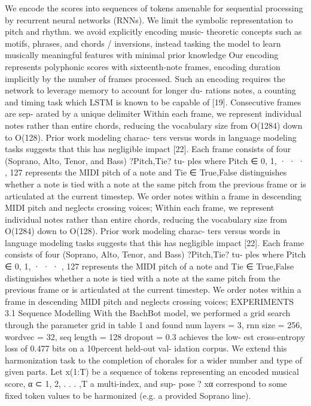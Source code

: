We encode the scores into sequences of tokens amenable for sequential processing by recurrent neural networks (RNNs). We limit the symbolic representation to pitch and rhythm. we avoid explicitly encoding music- theoretic concepts such as motifs, phrases, and chords / inversions, instead tasking the model to learn musically meaningful features with minimal prior knowledge
Our encoding represents polyphonic scores with sixteenth-note frames, encoding duration implicitly by the number of frames processed. Such an encoding requires the network to leverage memory to account for longer du- rations notes, a counting and timing task which LSTM is known to be capable of [19]. Consecutive frames are sep- arated by a unique delimiter
Within each frame, we represent individual notes rather than entire chords, reducing the vocabulary size from O(1284) down to O(128). Prior work modeling charac- ters versus words in language modeling tasks suggests that this has negligible impact [22]. Each frame consists of
four (Soprano, Alto, Tenor, and Bass) ?Pitch,Tie? tu- ples where Pitch ∈ {0, 1, · · · , 127} represents the MIDI pitch of a note and Tie ∈ {True,False} distinguishes whether a note is tied with a note at the same pitch from the previous frame or is articulated at the current timestep. We order notes within a frame in descending MIDI pitch and neglects crossing voices;
Within each frame, we represent individual notes rather
than entire chords, reducing the vocabulary size from O(1284) down to O(128). Prior work modeling charac- ters versus words in language modeling tasks suggests that this has negligible impact [22]. Each frame consists of
four (Soprano, Alto, Tenor, and Bass) ?Pitch,Tie? tu- ples where Pitch ∈ {0, 1, · · · , 127} represents the MIDI pitch of a note and Tie ∈ {True,False} distinguishes whether a note is tied with a note at the same pitch from the
previous frame or is articulated at the current timestep. We order notes within a frame in descending MIDI pitch and neglects crossing voices;
EXPERIMENTS 3.1 Sequence Modelling
With the BachBot model, we performed a grid search through the parameter grid in table 1 and found num layers = 3, rnn size = 256, wordvec = 32, seq length = 128 dropout = 0.3 achieves the low- est cross-entropy loss of 0.477 bits on a 10percent held-out val- idation corpus.
We extend this harmonization task to the completion of chorales for a wider number and type of given parts. Let
x(1:T) be a sequence of tokens representing an encoded musical score, α ⊂ {1, 2, . . . ,T} a multi-index, and sup- pose ?
xα correspond to some fixed token values to be harmonized (e.g. a provided Soprano line). 

